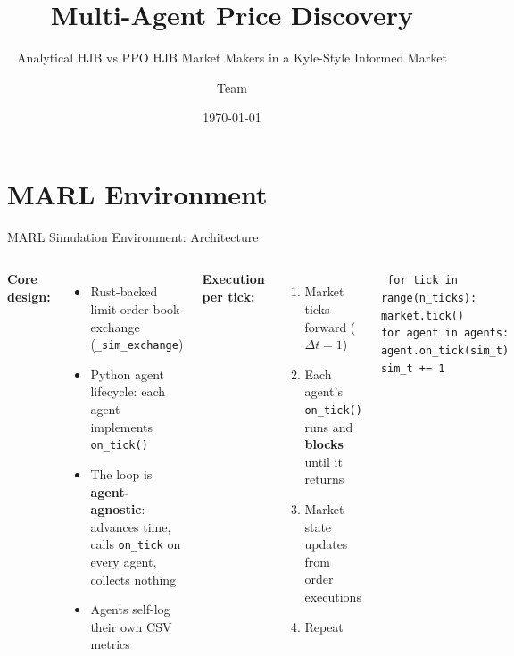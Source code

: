 \documentclass[10pt,aspectratio=169]{beamer}
\title{Multi-Agent Price Discovery}
\subtitle{Analytical HJB vs PPO HJB Market Makers in a Kyle-Style Informed Market}
\author{Team}
\date{\today}
\begin{document}
\begin{frame}
  \titlepage
\end{frame}

\section{MARL Environment}

\begin{frame}{MARL Simulation Environment: Architecture}
  \begin{columns}[T]
    \textbf{Core design:}
    \begin{itemize}
      \item Rust-backed limit-order-book exchange (\texttt{\_sim\_exchange})
      \item Python agent lifecycle: each agent implements \texttt{on\_tick()}
      \item The loop is \textbf{agent-agnostic}: advances time, calls \texttt{on\_tick} on every agent, collects nothing
      \item Agents self-log their own CSV metrics
    \end{itemize}

    \vspace{6pt}
    \textbf{Execution per tick:}
    \begin{enumerate}
      \item Market ticks forward ($\Delta t = 1$)
      \item Each agent's \texttt{on\_tick()} runs and \textbf{blocks} until it returns
      \item Market state updates from order executions
      \item Repeat
    \end{enumerate}

    \centering
    \vspace{20pt}
    \texttt{\footnotesize
    for tick in range(n\_ticks): \\
    \quad market.tick() \\
    \quad for agent in agents: \\
    \quad \quad agent.on\_tick(sim\_t) \\
    \quad sim\_t += 1
    }
  \end{columns}
\end{frame}
\end{document}
